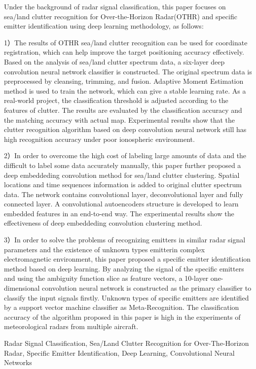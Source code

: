 \begin{Abstract}
Under the background of radar signal classification, this paper focuses on sea/land clutter recognition for Over-the-Horizon Radar(OTHR) and specific emitter identification using deep learning methodology, as follows:


1）The results of OTHR sea/land clutter recognition can be used for coordinate registration, which can help improve the target positioning accuracy effectively.
Based on the analysis of sea/land clutter spectrum data, a six-layer deep convolution neural network classifier is constructed. The original spectrum data is preprocessed by cleansing, trimming, and fusion.
Adaptive Moment Estimation method is used to train the network, which can give a stable learning rate.
As a real-world project, the classification threshold is adjusted according to the features of clutter. The results are evaluated by the classification accuracy and the matching accuracy with actual map.
Experimental results show that the clutter recognition algorithm based on deep convolution neural network still has high recognition accuracy under poor ionospheric environment.

2）In order to overcome the high cost of labeling large amounts of data and the difficult to label some data  accurately manually, this paper further proposed a deep embeddeding convolution method for sea/land clutter clustering.
Spatial locations and time sequences information is added to original clutter spectrum data. The network contains convolutional layer, deconvolutional layer and fully connected layer.
A convolutional autoencoders structure is developed to learn embedded features in an end-to-end way.
The experimental results show the effectiveness of deep embeddeding convolution clustering method.

3）In order to solve the problems of recognizing emitters in similar radar signal parameters and the existence of unknown types emitterin complex electromagnetic environment, this paper proposed a specific emitter identification method based on deep learning.
By analyzing the signal of the specific emitters and using the ambiguity function slice as feature vectors,
a 10-layer one-dimensional convolution neural network is constructed as the primary classifier to classify the input signals firstly. Unknown types of specific emitters are identified by a support vector machine classifier as Meta-Recognition.
The classification accuracy of the algorithm proposed in this paper is high in the experiments of meteorological radars from multiple aircraft.



	\begin{Keywords}
		Radar Signal Classification, Sea/Land Clutter Recognition for Over-The-Horizon Radar, Specific Emitter Identification, Deep Learning, Convolutional Neural Networks
	\end{Keywords}
\end{Abstract}